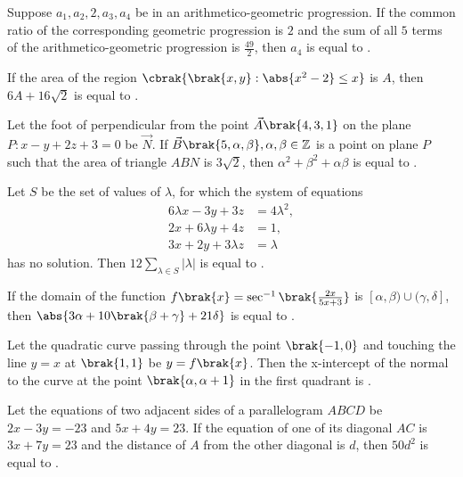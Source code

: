 \item Suppose $a_1, a_2, 2, a_3, a_4$ be in an arithmetico-geometric progression. If the common ratio of the corresponding geometric progression is $2$ and the sum of all $5$ terms of the arithmetico-geometric progression is $\frac{49}{2}$, then $a_4$ is equal to \underline{\hspace{1 cm}}. 
\item If the area of the region $\cbrak{\brak{x,y} : \abs{x^2-2} \le x}$ is $A$, then $6A + 16\sqrt{2}$ is equal to \underline{\hspace{1 cm}}. 
\item Let the foot of perpendicular from the point $\vec{A} \brak{4,3,1}$ on the plane $P : x - y + 2z +3 = 0$ be $\vec{N}$. If $\vec{B}\brak{5,\alpha,\beta}, \alpha, \beta \in \mathbb{Z}$ is a point on plane $P$ such that the area of triangle $ABN$ is $3\sqrt{2}$, then $\alpha^2 + \beta^2 +\alpha\beta $ is equal to \underline{\hspace{1 cm}}. 
\item Let $S$ be the set of values of $\lambda$, for which the system of equations 
\begin{align*}
	6\lambda x - 3y + 3z &= 4\lambda^2,\\ 
	2x + 6\lambda y + 4z &= 1, \\
	3x + 2y + 3\lambda z &= \lambda 
\end{align*}
has no solution. Then $12 \sum_{\lambda \in S} |\lambda|$ is equal to \underline{\hspace{1 cm}}. 
\item If the domain of the function $f\brak{x} = \sec^{-1}\brak{\frac{2x}{5x+3}}$ is $[\alpha,\beta) \cup (\gamma,\delta]$, then $\abs{3\alpha +10\brak{\beta + \gamma} + 21\delta}$ is equal to \underline{\hspace{1 cm}}. 
\item Let the quadratic curve passing through the point $\brak{-1,0}$ and touching the line $y=x$ at $\brak{1,1}$ be $y=f\brak{x}$. Then the x-intercept of the normal to the curve at the point $\brak{\alpha,\alpha + 1}$ in the first quadrant is \underline{\hspace{1 cm}}.
\item Let the equations of two adjacent sides of a parallelogram $ABCD$ be $2x-3y=-23$ and $5x + 4y = 23$. If the equation of one of its diagonal $AC$ is $3x + 7y = 23$ and the distance of $A$ from the other diagonal is $d$, then $50d^2$ is equal to \underline{\hspace{1 cm}}. 

